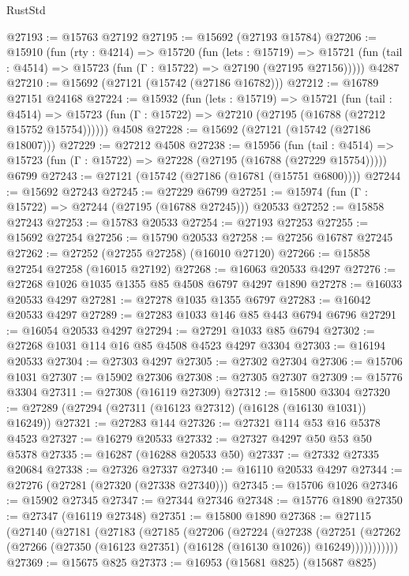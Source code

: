 \begin{lexlean}{RustStd}
\begin{coremodule}
@27193 := @15763 @27192
@27195 := @15692 (@27193 @15784)
@27206 := @15910
    (fun (rty : @4214) =>
    @15720
      (fun (lets : @15719) =>
      @15721 (fun (tail : @4514) => @15723 (fun (Γ : @15722) => @27190 (@27195 @27156)))))
    @4287
@27210 := @15692 (@27121 (@15742 (@27186 @16782)))
@27212 := @16789 @27151 @24168
@27224 := @15932
    (fun (lets : @15719) =>
    @15721
      (fun (tail : @4514) =>
      @15723 (fun (Γ : @15722) => @27210 (@27195 (@16788 (@27212 @15752 @15754))))))
    @4508
@27228 := @15692 (@27121 (@15742 (@27186 @18007)))
@27229 := @27212 @4508
@27238 := @15956
    (fun (tail : @4514) => @15723 (fun (Γ : @15722) => @27228 (@27195 (@16788 (@27229 @15754)))))
    @6799
@27243 := @27121 (@15742 (@27186 (@16781 (@15751 @6800))))
@27244 := @15692 @27243
@27245 := @27229 @6799
@27251 := @15974 (fun (Γ : @15722) => @27244 (@27195 (@16788 @27245))) @20533
@27252 := @15858 @27243
@27253 := @15783 @20533
@27254 := @27193 @27253
@27255 := @15692 @27254
@27256 := @15790 @20533
@27258 := @27256 @16787 @27245
@27262 := @27252 (@27255 @27258) (@16010 @27120)
@27266 := @15858 @27254 @27258 (@16015 @27192)
@27268 := @16063 @20533 @4297
@27276 := @27268 @1026 @1035 @1355 @85 @4508 @6797 @4297 @1890
@27278 := @16033 @20533 @4297
@27281 := @27278 @1035 @1355 @6797
@27283 := @16042 @20533 @4297
@27289 := @27283 @1033 @146 @85 @443 @6794 @6796
@27291 := @16054 @20533 @4297
@27294 := @27291 @1033 @85 @6794
@27302 := @27268 @1031 @114 @16 @85 @4508 @4523 @4297 @3304
@27303 := @16194 @20533
@27304 := @27303 @4297
@27305 := @27302 @27304
@27306 := @15706 @1031
@27307 := @15902 @27306
@27308 := @27305 @27307
@27309 := @15776 @3304
@27311 := @27308 (@16119 @27309)
@27312 := @15800 @3304
@27320 := @27289 (@27294 (@27311 (@16123 @27312) (@16128 (@16130 @1031)) @16249))
@27321 := @27283 @144
@27326 := @27321 @114 @53 @16 @5378 @4523
@27327 := @16279 @20533
@27332 := @27327 @4297 @50 @53 @50 @5378
@27335 := @16287 (@16288 @20533 @50)
@27337 := @27332 @27335 @20684
@27338 := @27326 @27337
@27340 := @16110 @20533 @4297
@27344 := @27276 (@27281 (@27320 (@27338 @27340)))
@27345 := @15706 @1026
@27346 := @15902 @27345
@27347 := @27344 @27346
@27348 := @15776 @1890
@27350 := @27347 (@16119 @27348)
@27351 := @15800 @1890
@27368 := @27115
    (@27140
      (@27181
        (@27183
          (@27185
            (@27206
              (@27224
                (@27238
                  (@27251
                    (@27262
                      (@27266 (@27350 (@16123 @27351) (@16128 (@16130 @1026)) @16249)))))))))))
@27369 := @15675 @825
@27373 := @16953 (@15681 @825) (@15687 @825)

\end{coremodule}
\end{lexlean}
